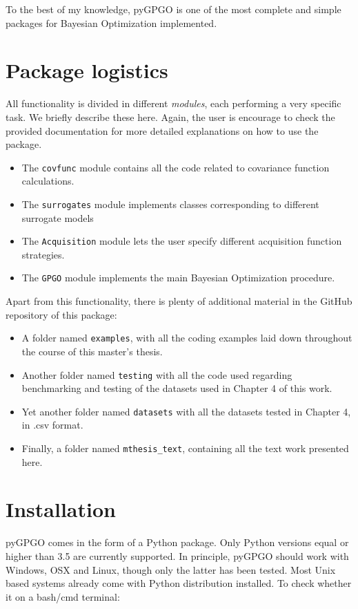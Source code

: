 \documentclass[10pt,a4paper,twoside]{book}
\begin{document}
To the best of my knowledge, pyGPGO is one of the most complete and simple packages for Bayesian Optimization implemented. 

\section{Package logistics}

All functionality is divided in different \textit{modules}, each performing a very specific task. We briefly describe these here. Again, the user is encourage to check the provided documentation for more detailed explanations on how to use the package.

\begin{itemize}
\item The \texttt{covfunc} module contains all the code related to covariance function calculations. 
\item The \texttt{surrogates} module implements classes corresponding to different surrogate models
\item The \texttt{Acquisition} module lets the user specify different acquisition function strategies.
\item The \texttt{GPGO} module implements the main Bayesian Optimization procedure. 
\end{itemize}

Apart from this functionality, there is plenty of additional material in the GitHub repository of this package:

\begin{itemize}
\item A folder named \texttt{examples}, with all the coding examples laid down throughout the course of this master's thesis.
\item Another folder named \texttt{testing} with all the code used regarding benchmarking and testing of the datasets used in Chapter 4 of this work.
\item Yet another folder named \texttt{datasets} with all the datasets tested in Chapter 4, in .csv format. 
\item Finally, a folder named \texttt{mthesis\_text}, containing all the text work presented here.
\end{itemize}

\section{Installation}

pyGPGO comes in the form of a Python package. Only Python versions equal or higher than 3.5 are currently supported. In principle, pyGPGO should work with Windows, OSX and Linux, though only the latter has been tested. Most Unix based systems already come with Python distribution installed. To check whether it on a bash/cmd terminal:
\end{document}
